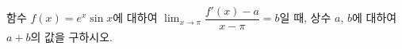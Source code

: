 함수 $f(x)=e^x\sin x$에 대하여 $\displaystyle\lim_{x\to\pi}\dfrac{f'(x)-a}{x-\pi}=b$일 때, 상수 $a$, $b$에 대하여 $a+b$의 값을 구하시오.
